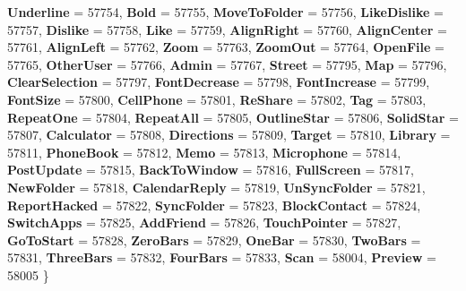 \begin{DoxyCompactItemize}
{\bfseries Underline} = 57754, 
\newline
{\bfseries Bold} = 57755, 
{\bfseries Move\+To\+Folder} = 57756, 
{\bfseries Like\+Dislike} = 57757, 
{\bfseries Dislike} = 57758, 
\newline
{\bfseries Like} = 57759, 
{\bfseries Align\+Right} = 57760, 
{\bfseries Align\+Center} = 57761, 
{\bfseries Align\+Left} = 57762, 
\newline
{\bfseries Zoom} = 57763, 
{\bfseries Zoom\+Out} = 57764, 
{\bfseries Open\+File} = 57765, 
{\bfseries Other\+User} = 57766, 
\newline
{\bfseries Admin} = 57767, 
{\bfseries Street} = 57795, 
{\bfseries Map} = 57796, 
{\bfseries Clear\+Selection} = 57797, 
\newline
{\bfseries Font\+Decrease} = 57798, 
{\bfseries Font\+Increase} = 57799, 
{\bfseries Font\+Size} = 57800, 
{\bfseries Cell\+Phone} = 57801, 
\newline
{\bfseries Re\+Share} = 57802, 
{\bfseries Tag} = 57803, 
{\bfseries Repeat\+One} = 57804, 
{\bfseries Repeat\+All} = 57805, 
\newline
{\bfseries Outline\+Star} = 57806, 
{\bfseries Solid\+Star} = 57807, 
{\bfseries Calculator} = 57808, 
{\bfseries Directions} = 57809, 
\newline
{\bfseries Target} = 57810, 
{\bfseries Library} = 57811, 
{\bfseries Phone\+Book} = 57812, 
{\bfseries Memo} = 57813, 
\newline
{\bfseries Microphone} = 57814, 
{\bfseries Post\+Update} = 57815, 
{\bfseries Back\+To\+Window} = 57816, 
{\bfseries Full\+Screen} = 57817, 
\newline
{\bfseries New\+Folder} = 57818, 
{\bfseries Calendar\+Reply} = 57819, 
{\bfseries Un\+Sync\+Folder} = 57821, 
{\bfseries Report\+Hacked} = 57822, 
\newline
{\bfseries Sync\+Folder} = 57823, 
{\bfseries Block\+Contact} = 57824, 
{\bfseries Switch\+Apps} = 57825, 
{\bfseries Add\+Friend} = 57826, 
\newline
{\bfseries Touch\+Pointer} = 57827, 
{\bfseries Go\+To\+Start} = 57828, 
{\bfseries Zero\+Bars} = 57829, 
{\bfseries One\+Bar} = 57830, 
\newline
{\bfseries Two\+Bars} = 57831, 
{\bfseries Three\+Bars} = 57832, 
{\bfseries Four\+Bars} = 57833, 
{\bfseries Scan} = 58004, 
\newline
{\bfseries Preview} = 58005
 \}
\item 
\mbox{\label{namespace_windows_1_1_u_i_1_1_xaml_1_1_controls_a69ed41c1bfc769995c091035ab6dd837}} 

\end{DoxyCompactItemize}
